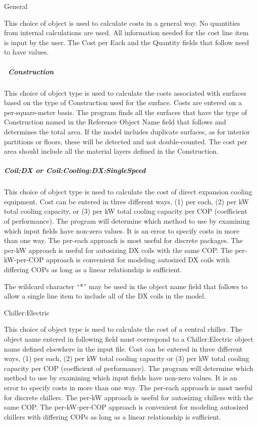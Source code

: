 General

This choice of object is used to calculate costs in a general way. No quantities from internal calculations are used. All information needed for the cost line item is input by the user. The Cost per Each and the Quantity fields that follow need to have values.

\subparagraph{~Construction}\label{construction}

This choice of object type is used to calculate the costs associated with surfaces based on the type of Construction used for the surface. Costs are entered on a per-square-meter basis. The program finds all the surfaces that have the type of Construction named in the Reference Object Name field that follows and determines the total area. If the model includes duplicate surfaces, as for interior partitions or floors, these will be detected and not double-counted. The cost per area should include all the material layers defined in the Construction.

\subparagraph{Coil:DX or Coil:Cooling:DX:SingleSpeed}\label{coildx-or-coilcoolingdxsinglespeed}

This choice of object type is used to calculate the cost of direct expansion cooling equipment. Cost can be entered in three different ways, (1) per each, (2) per kW total cooling capacity, or (3) per kW total cooling capacity per COP (coefficient of performance). The program will determine which method to use by examining which input fields have non-zero values. It is an error to specify costs in more than one way. The per-each approach is most useful for discrete packages. The per-kW approach is useful for autosizing DX coils with the same COP. The per-kW-per-COP approach is convenient for modeling autosized DX coils with differing COPs as long as a linear relationship is sufficient.

The wildcard character ``*'' may be used in the object name field that follows to allow a single line item to include all of the DX coils in the model.

Chiller:Electric

This choice of object type is used to calculate the cost of a central chiller. The object name entered in following field must correspond to a Chiller:Electric object name defined elsewhere in the input file. Cost can be entered in three different ways, (1) per each, (2) per kW total cooling capacity or (3) per kW total cooling capacity per COP (coefficient of performance). The program will determine which method to use by examining which input fields have non-zero values. It is an error to specify costs in more than one way. The per-each approach is most useful for discrete chillers. The per-kW approach is useful for autosizing chillers with the same COP. The per-kW-per-COP approach is convenient for modeling autosized chillers with differing COPs as long as a linear relationship is sufficient.

